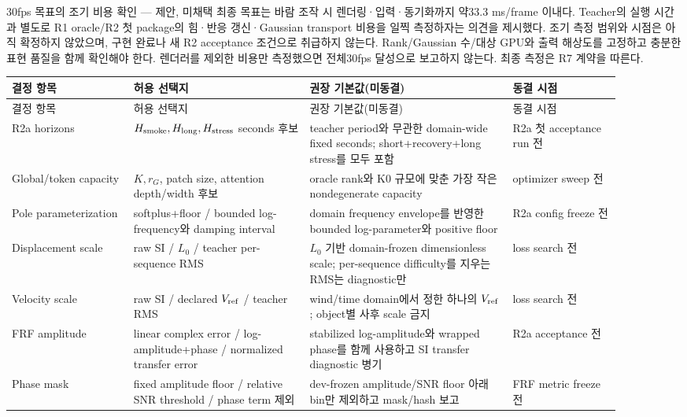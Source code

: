 \documentclass[10pt]{article}
\begin{document}
\begin{decisionbox}{30fps 목표의 조기 비용 확인 --- 제안, 미채택}
최종 목표는 바람 조작 시 렌더링·입력·동기화까지 약33.3 ms/frame 이내다. Teacher의 실행 시간과 별도로
R1 oracle/R2 첫 package의 힘·반응 갱신·Gaussian transport 비용을 일찍 측정하자는 의견을 제시했다.
조기 측정 범위와 시점은 아직 확정하지 않았으며, 구현 완료나 새 R2 acceptance 조건으로 취급하지 않는다.
Rank/Gaussian 수/대상 GPU와 출력 해상도를 고정하고 충분한 표현 품질을 함께 확인해야 한다.
렌더러를 제외한 비용만 측정했으면 전체30fps 달성으로 보고하지 않는다. 최종 측정은 R7 계약을 따른다.
\end{decisionbox}

\begin{longtable}{L{0.18\linewidth}L{0.26\linewidth}L{0.30\linewidth}L{0.16\linewidth}}
\toprule
결정 항목 & 허용 선택지 & 권장 기본값(미동결) & 동결 시점\\
\midrule
\endfirsthead
\toprule
결정 항목 & 허용 선택지 & 권장 기본값(미동결) & 동결 시점\\
\midrule
\endhead
R2a horizons & \(H_{\rm smoke},H_{\rm long},H_{\rm stress}\) seconds 후보 & teacher period와 무관한 domain-wide fixed seconds; short+recovery+long stress를 모두 포함 & R2a 첫 acceptance run 전\\
Global/token capacity & \(K,r_G\), patch size, attention depth/width 후보 & oracle rank와 K0 규모에 맞춘 가장 작은 nondegenerate capacity & optimizer sweep 전\\
Pole parameterization & softplus+floor / bounded log-frequency와 damping interval & domain frequency envelope를 반영한 bounded log-parameter와 positive floor & R2a config freeze 전\\
Displacement scale & raw SI / \(L_0\) / teacher per-sequence RMS & \(L_0\) 기반 domain-frozen dimensionless scale; per-sequence difficulty를 지우는 RMS는 diagnostic만 & loss search 전\\
Velocity scale & raw SI / declared \(V_{\rm ref}\) / teacher RMS & wind/time domain에서 정한 하나의 \(V_{\rm ref}\); object별 사후 scale 금지 & loss search 전\\
FRF amplitude & linear complex error / log-amplitude+phase / normalized transfer error & stabilized log-amplitude와 wrapped phase를 함께 사용하고 SI transfer diagnostic 병기 & R2a acceptance 전\\
Phase mask & fixed amplitude floor / relative SNR threshold / phase term 제외 & dev-frozen amplitude/SNR floor 아래 bin만 제외하고 mask/hash 보고 & FRF metric freeze 전\\

\end{longtable}
\end{document}
